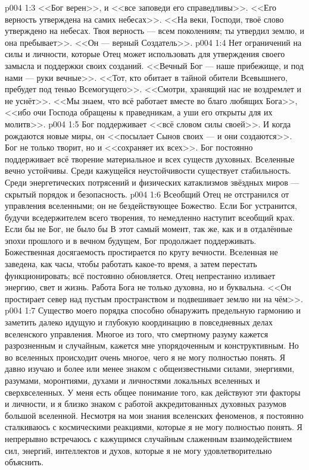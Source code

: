 \vs p004 1:3 <<Бог верен>>, и <<все заповеди его справедливы>>. <<Его верность утверждена на самих небесах>>. <<На веки, Господи, твоё слово утверждено на небесах. Твоя верность --- всем поколениям; ты утвердил землю, и она пребывает>>. <<Он --- верный Создатель>>.
\vs p004 1:4 Нет ограничений на силы и личности, которые Отец может использовать для утверждения своего замысла и поддержки своих созданий. <<Вечный Бог --- наше прибежище, и под нами --- руки вечные>>. <<Тот, кто обитает в тайной обители Всевышнего, пребудет под тенью Всемогущего>>. <<Смотри, хранящий нас не воздремлет и не уснёт>>. <<Мы знаем, что всё работает вместе во благо любящих Бога>>, <<ибо очи Господа обращены к праведникам, а уши его открыты для их молитв>>.
\vs p004 1:5 Бог поддерживает <<всё словом силы своей>>. И когда рождаются новые миры, он <<посылает Сынов своих --- и они создаются>>. Бог не только творит, но и <<сохраняет их всех>>. Бог постоянно поддерживает всё творение материальное и всех существ духовных. Вселенные вечно устойчивы. Среди кажущейся неустойчивости существует стабильность. Среди энергетических потрясений и физических катаклизмов звёздных миров --- скрытый порядок и безопасность.
\vs p004 1:6 Всеобщий Отец не отстранился от управления вселенными; он не бездействующее Божество. Если Бог устранится, будучи вседержителем всего творения, то немедленно наступит всеобщий крах. Если бы не Бог, не было бы  В этот самый момент, так же, как и в отдалённые эпохи прошлого и в вечном будущем, Бог продолжает поддерживать. Божественная досягаемость простирается по кругу вечности. Вселенная не заведена, как часы, чтобы работать какое\hyp{}то время, а затем перестать функционировать; всё постоянно обновляется. Отец непрестанно изливает энергию, свет и жизнь. Работа Бога не только духовна, но и буквальна. <<Он простирает север над пустым пространством и подвешивает землю ни на чём>>.
\vs p004 1:7 \pc Существо моего порядка способно обнаружить предельную гармонию и заметить далеко идущую и глубокую координацию в повседневных делах вселенского управления. Многое из того, что смертному разуму кажется разрозненным и случайным, кажется мне упорядоченным и конструктивным. Но во вселенных происходит очень многое, чего я не могу полностью понять. Я давно изучаю и более или менее знаком с общеизвестными силами, энергиями, разумами, моронтиями, духами и личностями локальных вселенных и сверхвселенных. У меня есть общее понимание того, как действуют эти факторы и личности, и я близко знаком с работой аккредитованных духовных разумов большой вселенной. Несмотря на мои знания вселенских феноменов, я постоянно сталкиваюсь с космическими реакциями, которые я не могу полностью понять. Я непрерывно встречаюсь с кажущимся случайным слаженным взаимодействием сил, энергий, интеллектов и духов, которые я не могу удовлетворительно объяснить.
